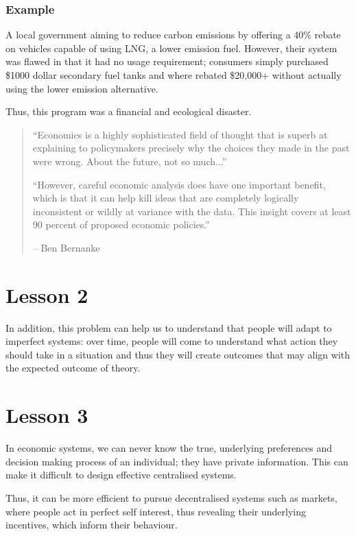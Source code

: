 \documentclass[12pt]{report}
\begin{document}
\subsubsection{Example}
A local government aiming to reduce carbon emissions by offering a 40\% rebate on vehicles capable 
of using LNG, a lower emission fuel. However, their system was flawed in that it had no usage requirement;
consumers simply purchased \$1000 dollar secondary fuel tanks and where rebated \$20,000+ without actually
using the lower emission alternative.
\par
Thus, this program was a financial and ecological disaster.

\begin{quotation}
``Economics is a highly sophisticated field of thought that is superb at explaining to policymakers precisely 
why the choices they made in the past were wrong. About the future, not so much...''
\par
``However, careful economic analysis does have one important benefit, which is that it can help kill ideas that are completely
logically inconsistent or wildly at variance with the data. This insight covers at least 90 percent of proposed economic policies.''
\par
-- Ben Bernanke
\end{quotation}

\section*{Lesson 2}
In addition, this problem can help us to understand that people will adapt to imperfect systems:
over time, people will come to understand what action they should take in a situation and thus they
will create outcomes that may align with the expected outcome of theory.

\section*{Lesson 3}
In economic systems, we can never know the true, underlying preferences and decision 
making process of an individual; they have private information. This can make it difficult
to design effective centralised systems.
\par
Thus, it can be more efficient to pursue decentralised systems such as markets,
where people act in perfect self interest, thus revealing their underlying incentives, which 
inform their behaviour.
\end{document}
